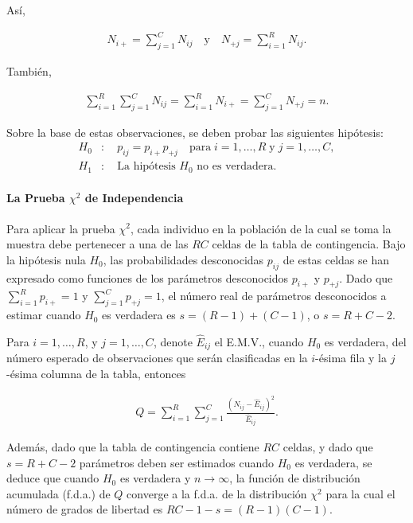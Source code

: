 \documentclass{book}
\begin{document}
Así,

\begin{align}
N_{i+} = \sum_{j=1}^{C} N_{ij} \quad \text{y} \quad N_{+j} = \sum_{i=1}^{R} N_{ij}.
\end{align}

También,

\begin{align}
\sum_{i=1}^{R} \sum_{j=1}^{C} N_{ij} = \sum_{i=1}^{R} N_{i+} = \sum_{j=1}^{C} N_{+j} = n.
\end{align}

Sobre la base de estas observaciones, se deben probar las siguientes hipótesis:
\begin{align}
H_0&: \quad p_{ij} = p_{i+}p_{+j} \quad \text{para} \; i = 1, \ldots, R \; \text{y} \; j = 1, \ldots, C, \\
H_1&: \quad \text{La hipótesis } H_0 \text{ no es verdadera.}
\end{align}

\paragraph*{La Prueba $\chi^2$ de Independencia}
Para aplicar la prueba $\chi^2$, cada individuo en la población de la cual se toma la muestra debe pertenecer a una de las $RC$ celdas de la tabla de contingencia. Bajo la hipótesis nula $H_0$, las probabilidades desconocidas $p_{ij}$ de estas celdas se han expresado como funciones de los parámetros desconocidos $p_{i+}$ y $p_{+j}$. Dado que $\sum_{i=1}^{R} p_{i+} = 1$ y $\sum_{j=1}^{C} p_{+j} = 1$, el número real de parámetros desconocidos a estimar cuando $H_0$ es verdadera es $s = (R - 1) + (C - 1)$, o $s = R + C - 2$.

Para $i = 1, \ldots, R$, y $j = 1, \ldots, C$, denote $\hat{E}_{ij}$ el E.M.V., cuando $H_0$ es verdadera, del número esperado de observaciones que serán clasificadas en la $i$-ésima fila y la $j$-ésima columna de la tabla, entonces

\begin{align}
Q = \sum_{i=1}^{R} \sum_{j=1}^{C} \frac{(N_{ij} - \hat{E}_{ij})^2}{\hat{E}_{ij}}.
\end{align}

Además, dado que la tabla de contingencia contiene $RC$ celdas, y dado que $s = R + C - 2$ parámetros deben ser estimados cuando $H_0$ es verdadera, se deduce que cuando $H_0$ es verdadera y $n \to \infty$, la función de distribución acumulada (f.d.a.) de $Q$ converge a la f.d.a. de la distribución $\chi^2$ para la cual el número de grados de libertad es $RC - 1 - s = (R - 1)(C - 1)$.
\end{document}
